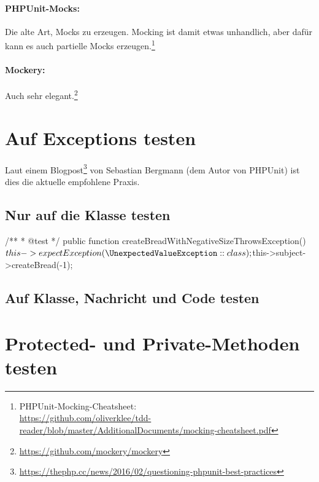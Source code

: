\documentclass[a4paper,11pt,headsepline]{scrartcl}
\begin{document}
\paragraph{PHPUnit-Mocks:} Die alte Art, Mocks zu erzeugen. Mocking ist damit etwas unhandlich, aber dafür kann es auch partielle Mocks erzeugen.\footnote{PHPUnit-Mocking-Cheatsheet:\\ \url{https://github.com/oliverklee/tdd-reader/blob/master/AdditionalDocuments/mocking-cheatsheet.pdf}}
\paragraph{Mockery:} Auch sehr elegant.\footnote{\url{https://github.com/mockery/mockery}}



\pagebreak
\section{Auf Exceptions testen}

Laut einem Blogpost\footnote{\url{https://thephp.cc/news/2016/02/questioning-phpunit-best-practices}} von Sebastian Bergmann (dem Autor von PHPUnit) ist dies die aktuelle empfohlene Praxis.

\subsection{Nur auf die Klasse testen}
\begin{phpcode}
/**
 * @test
 */
public function createBreadWithNegativeSizeThrowsException()
{
    $this->expectException(\UnexpectedValueException::class);

    $this->subject->createBread(-1);
}
\end{phpcode}

\subsection{Auf Klasse, Nachricht und Code testen}


\section{Protected- und Private-Methoden testen}
\end{document}
